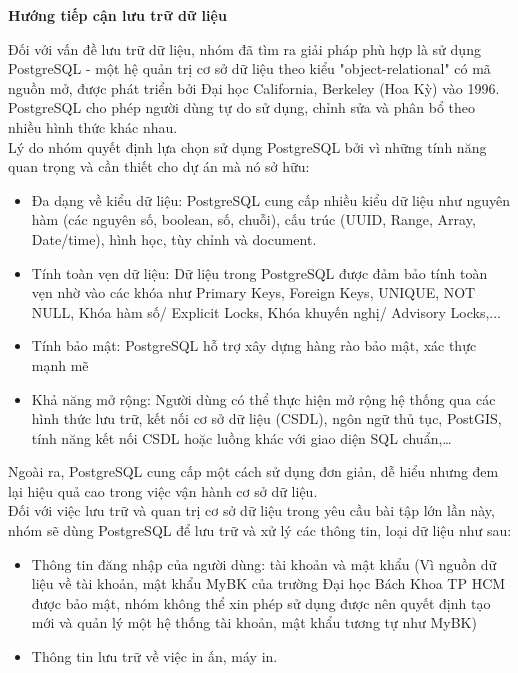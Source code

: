 \documentclass[a4paper]{article}
\begin{document}
\noindent \textbf{Hướng tiếp cận lưu trữ dữ liệu}

\noindent Đối với vấn đề lưu trữ dữ liệu, nhóm đã tìm ra giải pháp phù hợp là sử dụng PostgreSQL - một hệ quản trị cơ sở dữ liệu theo kiểu "object-relational" có mã nguồn mở, được phát triển bởi Đại học California, Berkeley (Hoa Kỳ) vào 1996. PostgreSQL cho phép người dùng tự do sử dụng, chỉnh sửa và phân bổ theo nhiều hình thức khác nhau.\\

\noindent Lý do nhóm quyết định lựa chọn sử dụng PostgreSQL bởi vì những tính năng quan trọng và cần thiết cho dự án mà nó sở hữu:
\begin{itemize}
    \item Đa dạng về kiểu dữ liệu: PostgreSQL cung cấp nhiều kiểu dữ liệu như nguyên hàm (các nguyên số, boolean, số, chuỗi), cấu trúc (UUID, Range, Array, Date/time), hình học, tùy chỉnh và document.
    \item Tính toàn vẹn dữ liệu: Dữ liệu trong PostgreSQL được đảm bảo tính toàn vẹn nhờ vào các khóa như Primary Keys, Foreign Keys, UNIQUE, NOT NULL, Khóa hàm số/ Explicit Locks, Khóa khuyến nghị/ Advisory Locks,...
    \item Tính bảo mật: PostgreSQL hỗ trợ xây dựng hàng rào bảo mật, xác thực mạnh mẽ
    \item Khả năng mở rộng: Người dùng có thể thực hiện mở rộng hệ thống qua các hình thức lưu trữ, kết nối cơ sở dữ liệu (CSDL), ngôn ngữ thủ tục, PostGIS, tính năng kết nối CSDL hoặc luồng khác với giao diện SQL chuẩn,…
\end{itemize}
\noindent Ngoài ra, PostgreSQL cung cấp một cách sử dụng đơn giản, dễ hiểu nhưng đem lại hiệu quả cao trong việc vận hành cơ sở dữ liệu.\\

\noindent Đối với việc lưu trữ và quan trị cơ sở dữ liệu
trong yêu cầu bài tập lớn lần này, nhóm sẽ dùng PostgreSQL để lưu trữ và xử lý các thông tin, loại dữ liệu như sau:
\begin{itemize}
    \item Thông tin đăng nhập của người dùng: tài khoản và mật khẩu (Vì nguồn dữ liệu về tài khoản, mật khẩu MyBK của trường Đại học Bách Khoa TP HCM được bảo mật, nhóm không thể xin phép sử dụng được nên quyết định tạo mới và quản lý một hệ thống tài khoản, mật khẩu tương tự như MyBK)

    \item Thông tin lưu trữ về việc in ấn, máy in.
\end{itemize}
\end{document}
